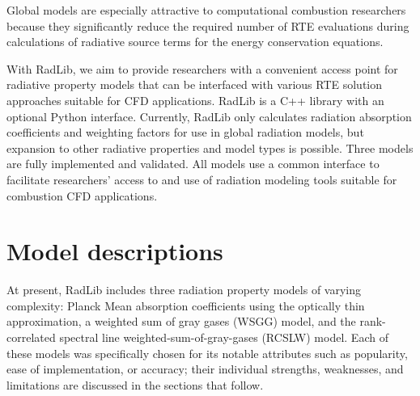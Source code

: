 \documentclass[preprint,12pt]{elsarticle}
\newcounter{bla}
\begin{document}
%
Global models are especially attractive to computational combustion researchers because they significantly reduce the required number of RTE evaluations during calculations of radiative source terms for the energy conservation equations. 

With RadLib, we aim to provide researchers with a convenient access point for radiative property models that can be interfaced with various RTE solution approaches suitable for CFD applications. RadLib is a C++ library with an optional Python interface. Currently, RadLib only calculates radiation absorption coefficients and weighting factors for use in global radiation models, but expansion to other radiative properties and model types is possible. Three models are fully implemented and validated. All models use a common interface to facilitate researchers' access to and use of radiation modeling tools suitable for combustion CFD applications.


\section{Model descriptions} \label{s:models}

At present, RadLib includes three radiation property models of varying complexity: Planck Mean absorption coefficients using the optically thin approximation, a weighted sum of gray gases (WSGG) model, and the rank-correlated spectral line weighted-sum-of-gray-gases (RCSLW) model. Each of these models was specifically chosen for its notable attributes such as popularity, ease of implementation, or accuracy; their individual strengths, weaknesses, and limitations are discussed in the sections that follow. 
\end{document}
